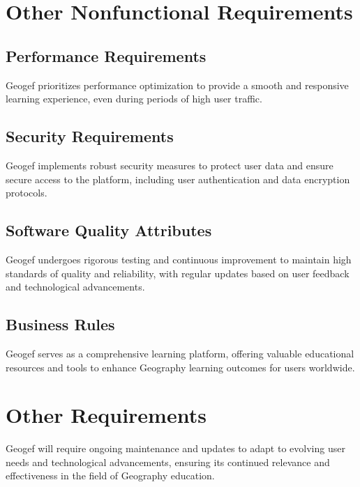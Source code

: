 \documentclass{scrreprt}
\begin{document}
\chapter{Other Nonfunctional Requirements}

\section{Performance Requirements}
Geogef prioritizes performance optimization to provide a smooth and responsive learning experience, even during periods of high user traffic.

\section{Security Requirements}
Geogef implements robust security measures to protect user data and ensure secure access to the platform, including user authentication and data encryption protocols.

\section{Software Quality Attributes}
Geogef undergoes rigorous testing and continuous improvement to maintain high standards of quality and reliability, with regular updates based on user feedback and technological advancements.

\section{Business Rules}
Geogef serves as a comprehensive learning platform, offering valuable educational resources and tools to enhance Geography learning outcomes for users worldwide.

\chapter{Other Requirements}

Geogef will require ongoing maintenance and updates to adapt to evolving user needs and technological advancements, ensuring its continued relevance and effectiveness in the field of Geography education.
\end{document}
